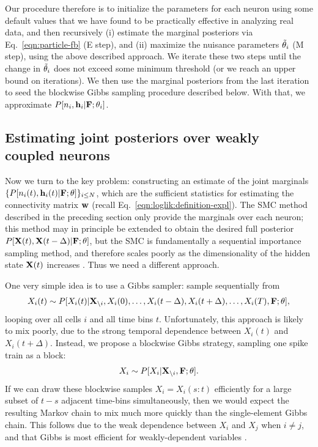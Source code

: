 Our procedure therefore is to initialize the parameters for each neuron using some default values that we have found to be practically effective in analyzing real data, and then recursively (i) estimate the marginal posteriors via Eq.~\eqref{eqn:particle-fb} (E step), and (ii) maximize the nuisance parameters $\tilde{\mathbf{\theta}}_i$ (M step), using the above described approach. We iterate these two steps until the change in $\tilde{\mathbf{\theta}}_i$ does not exceed some minimum threshold (or we reach an upper bound on iterations). We then use the marginal posteriors from the last iteration to seed the blockwise Gibbs sampling procedure described below. With that, we approximate $P[n_i,\mathbf{h}_i | {\bf F};\mathbf{\theta}_i]$.

\subsection{Estimating joint posteriors over weakly coupled neurons}
\label{sec:methods:joint}

Now we turn to the key problem: constructing an estimate of the joint marginals $\{P[n_i(t), \mathbf{h}_i(t) | {\bf F};\mathbf{\theta}]\}_{i\leq N}$, which are the sufficient statistics for estimating the connectivity matrix $\mathbf{w}$ (recall Eq.~\eqref{eqn:loglik:definition-expl}). The SMC method described in the preceding section only provide the marginals over each neuron; this method may in principle be extended to obtain the desired full posterior $P[{\bf X}(t), {\bf X}(t-\Delta) | {\bf F}; \mathbf{\theta}]$, but the SMC is fundamentally a sequential importance sampling method, and therefore scales poorly as the dimensionality of the hidden state ${\bf X}(t)$ increases \cite{BickelBengtsson08}. Thus we need a different approach.

One very simple idea is to use a Gibbs sampler: sample sequentially
from
\begin{align}
X_i(t) \sim P[X_i(t) | {\bf X}_{\backslash i}, X_i(0), \ldots, X_i(t-\Delta),
 X_i(t+\Delta), \ldots, X_i(T), {\bf F}; \mathbf{\theta}],
\end{align}
looping over all cells $i$ and all time bins $t$. Unfortunately, this approach is likely to mix poorly, due to the strong temporal dependence between $X_i(t)$ and $X_i(t+\Delta)$. Instead, we propose a blockwise Gibbs strategy, sampling one spike train as a block:
\begin{align}
	X_i \sim P[X_i | {\bf X}_{\backslash i}, {\bf F}; \mathbf{\theta}].
\end{align}
If we can draw these blockwise samples $X_i = X_i(s:t)$ efficiently for a large subset of $t-s$ adjacent time-bins simultaneously, then we would expect the resulting Markov chain to mix much more quickly than the single-element Gibbs chain.  This follows due to the weak dependence between $X_i$ and $X_j$ when $i\neq j$, and that Gibbs is most efficient for weakly-dependent variables \cite{RC05}.

